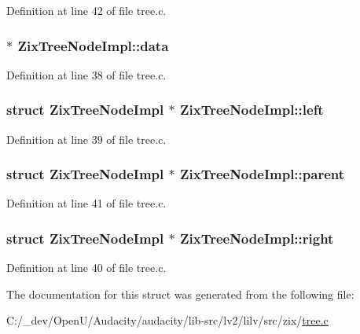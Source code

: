 Definition at line 42 of file tree.\+c.

\subsubsection[{\texorpdfstring{data}{data}}]{ $\ast$ Zix\+Tree\+Node\+Impl\+::data}\hypertarget{struct_zix_tree_node_impl_a7ddf48bc6cd34adf669d0a883aca7a6b}{}\label{struct_zix_tree_node_impl_a7ddf48bc6cd34adf669d0a883aca7a6b}


Definition at line 38 of file tree.\+c.

\subsubsection[{\texorpdfstring{left}{left}}]{\setlength{\rightskip}{0pt plus 5cm}struct {\bf Zix\+Tree\+Node\+Impl} $\ast$ Zix\+Tree\+Node\+Impl\+::left}\hypertarget{struct_zix_tree_node_impl_a038c10ec0d0308a32a04a979adc7701d}{}\label{struct_zix_tree_node_impl_a038c10ec0d0308a32a04a979adc7701d}


Definition at line 39 of file tree.\+c.

\subsubsection[{\texorpdfstring{parent}{parent}}]{\setlength{\rightskip}{0pt plus 5cm}struct {\bf Zix\+Tree\+Node\+Impl} $\ast$ Zix\+Tree\+Node\+Impl\+::parent}\hypertarget{struct_zix_tree_node_impl_a0886e02d15e99c234f39919d82fd4418}{}\label{struct_zix_tree_node_impl_a0886e02d15e99c234f39919d82fd4418}


Definition at line 41 of file tree.\+c.

\subsubsection[{\texorpdfstring{right}{right}}]{\setlength{\rightskip}{0pt plus 5cm}struct {\bf Zix\+Tree\+Node\+Impl} $\ast$ Zix\+Tree\+Node\+Impl\+::right}\hypertarget{struct_zix_tree_node_impl_a5285b1950acea36f82ed91d4cb2cb227}{}\label{struct_zix_tree_node_impl_a5285b1950acea36f82ed91d4cb2cb227}


Definition at line 40 of file tree.\+c.



The documentation for this struct was generated from the following file\+:\begin{DoxyCompactItemize}
\item 
C\+:/\+\_\+dev/\+Open\+U/\+Audacity/audacity/lib-\/src/lv2/lilv/src/zix/\hyperlink{lilv_2src_2zix_2tree_8c}{tree.\+c}\end{DoxyCompactItemize}
